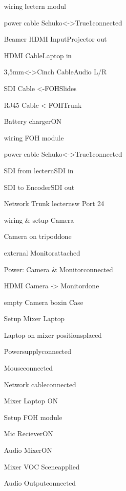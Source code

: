 \begin{checklist}{wiring lectern modul}
  \item{power cable Schuko<->True1}{connected}
  \item{Beamer HDMI Input}{Projector out}
  \item{HDMI Cable}{Laptop in}
  \item{3,5mm<->Cinch Cable}{Audio L/R}
  \item{SDI Cable <-FOH}{Slides}
  \item{RJ45 Cable <-FOH}{Trunk}
  \item{Battery charger}{ON}
\end{checklist}

\begin{checklist}{wiring FOH module}
  \item{power cable Schuko<->True1}{connected}
  \item{SDI from lectern}{SDI in}
  \item{SDI to Encoder}{SDI out}
  \item{Network Trunk lectern}{sw Port 24}
\end{checklist}

\begin{checklist}{wiring & setup Camera}
  \item{Camera on tripod}{done}
  \item{external Monitor}{attached}
  \item{Power: Camera & Monitor}{connected}
  \item{HDMI Camera -> Monitor}{done}
  \item{empty Camera box}{in Case}
\end{checklist}

\begin{checklist}{Setup Mixer Laptop}
  \item{Laptop on mixer positions}{placed}
  \item{Powersupply}{connected}
  \item{Mouse}{connected}
  \item{Network cable}{connected}
  \item{Mixer Laptop }{ON}
\end{checklist}

\begin{checklist}{Setup FOH module}
  \item{Mic Reciever}{ON}
  \item{Audio Mixer}{ON}
  \item{Mixer VOC Scene}{applied}
  \item{Audio Output}{connected}
\end{checklist}

